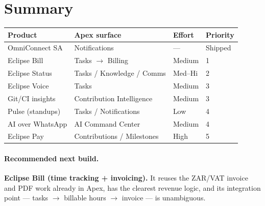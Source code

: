 \documentclass[11pt]{article}
\begin{document}
\section{Summary}
\begin{center}
\begin{tabular}{>{\raggedright\arraybackslash}p{4.2cm} >{\raggedright\arraybackslash}p{4.6cm} l l}
\toprule
\textbf{Product} & \textbf{Apex surface} & \textbf{Effort} & \textbf{Priority} \\
\midrule
OmniConnect SA      & Notifications              & ---     & Shipped \\
Eclipse Bill        & Tasks $\rightarrow$ Billing & Medium  & 1 \\
Eclipse Status      & Tasks / Knowledge / Comms  & Med--Hi & 2 \\
Eclipse Voice       & Tasks                      & Medium  & 3 \\
Git/CI insights     & Contribution Intelligence  & Medium  & 3 \\
Pulse (standups)    & Tasks / Notifications      & Low     & 4 \\
AI over WhatsApp    & AI Command Center          & Medium  & 4 \\
Eclipse Pay         & Contributions / Milestones & High    & 5 \\
\bottomrule
\end{tabular}
\end{center}

\paragraph{Recommended next build.}
\textbf{Eclipse Bill (time tracking + invoicing).} It reuses the ZAR/VAT invoice
and PDF work already in Apex, has the clearest revenue logic, and its
integration point --- tasks $\rightarrow$ billable hours $\rightarrow$ invoice
--- is unambiguous.
\end{document}
